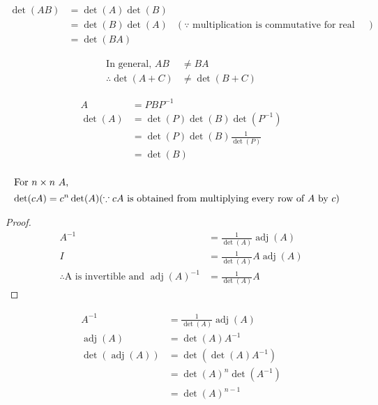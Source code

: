 \documentclass[12pt]{article}
\newenvironment{problem}[2][Problem]{\begin{trivlist}
\item[\hskip \labelsep {\bfseries #1}\hskip \labelsep {\bfseries #2.}]}{\end{trivlist}}
\begin{document}
\begin{problem}{3.d}
\end{problem}
\begin{align*} 
\det(AB) &= \det(A) \det(B) \\
&= \det(B) \det(A) & (\text{$\because$ multiplication is commutative for real numbers})\\ 
&= \det(BA)
\end{align*}

\begin{problem}{3.e}
\end{problem}
\begin{align*} 
\text{In general, } AB &\ne BA \\
\therefore \det(A+C) &\ne \det(B+C)
\end{align*}

\begin{problem}{3.e}
\end{problem}
\begin{align*}
A &= PBP^{-1}\\ 
\det(A) &= \det(P) \det(B) \det(P^{-1})\\
&= \det(P) \det(B) \frac{1}{\det(P)}\\
&= \det(B)\\
\end{align*}

\begin{problem}{3.e}
\end{problem}
\begin{align*}
\intertext{For $n\times n$ $A$,}
\det(cA) = c^n \det(A) & (\text{$\because cA$ is obtained from multiplying every row of $A$ by $c$})
\end{align*}

\begin{problem}{4.a}
\end{problem}
\begin{proof}
\begin{align*}
A^{-1} &= \frac{1}{\det(A)}\operatorname{adj}(A)\\
I &= \frac{1}{\det(A)} A \operatorname{adj}(A)\\
\therefore \text{A is invertible and } \operatorname{adj}(A)^{-1} &= \frac{1}{\det(A)} A 
\end{align*}
\end{proof}

\begin{problem}{4.b}
\end{problem}
\begin{align*}
A^{-1} &= \frac{1}{\det(A)}\operatorname{adj}(A)\\
\operatorname{adj}(A) &= \det(A) A^{-1}\\
\det(\operatorname{adj}(A)) &= \det(\det(A) A^{-1})\\
&= \det(A)^n \det(A^{-1})\\
&= \det(A)^{n-1}
\end{align*}
\end{document}
